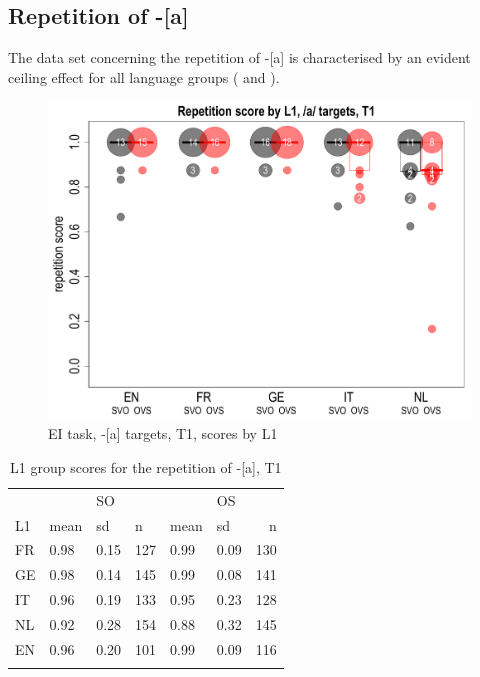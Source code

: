 \subsection{Repetition of -[a]}\label{sec:04:2.5}

The data set concerning the repetition of -[a] is characterised by an evident ceiling effect for all language groups ( and ).

\begin{figure}
    \includegraphics[width=\textwidth]{figures/04-6.pdf}
    \caption{EI task, -[a] targets, T1, scores by L1}
    \label{fig:04:6}
\end{figure}

\begin{table}
    \begin{tabularx}{\textwidth}{XXXXXXr}
    \lsptoprule
    & &{SO}& & &{OS}&\\
    L1 & mean & sd & n & mean & sd & n\\
    \midrule
    FR & 0.98 & 0.15 & 127 & 0.99 & 0.09 & 130\\
    GE & 0.98 & 0.14 & 145 & 0.99 & 0.08 & 141\\
    IT & 0.96 & 0.19 & 133 & 0.95 & 0.23 & 128\\
    NL & 0.92 & 0.28 & 154 & 0.88 & 0.32 & 145\\
    EN & 0.96 & 0.20 & 101 & 0.99 & 0.09 & 116\\
    \lspbottomrule
    \end{tabularx}
    \caption{L1 group scores for the repetition of -[a], T1}
    \label{tab:04:7}
\end{table}

